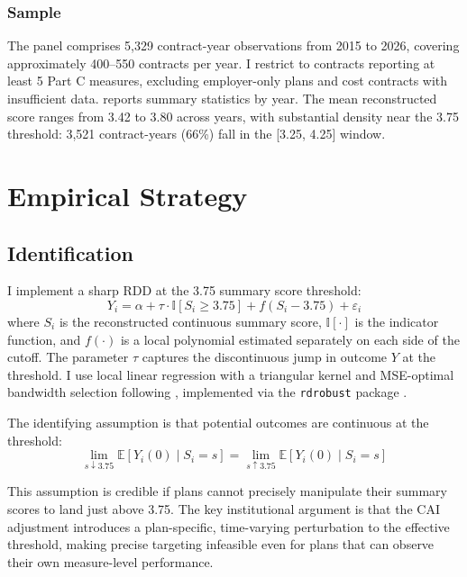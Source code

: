 \documentclass[12pt]{article}
\newcommand{\E}{\mathbb{E}}
\newcommand{\ind}{\mathbb{I}}
\begin{document}
\subsubsection*{Sample} The panel comprises 5,329 contract-year observations from 2015 to 2026, covering approximately 400--550 contracts per year. I restrict to contracts reporting at least 5 Part C measures, excluding employer-only plans and cost contracts with insufficient data.  reports summary statistics by year. The mean reconstructed score ranges from 3.42 to 3.80 across years, with substantial density near the 3.75 threshold: 3,521 contract-years (66\%) fall in the [3.25, 4.25] window.




\section{Empirical Strategy}
\label{sec:strategy}

\subsection{Identification}

I implement a sharp RDD at the 3.75 summary score threshold:
\begin{equation}
Y_i = \alpha + \tau \cdot \ind[S_i \geq 3.75] + f(S_i - 3.75) + \varepsilon_i
\end{equation}
where $S_i$ is the reconstructed continuous summary score, $\ind[\cdot]$ is the indicator function, and $f(\cdot)$ is a local polynomial estimated separately on each side of the cutoff. The parameter $\tau$ captures the discontinuous jump in outcome $Y$ at the threshold. I use local linear regression with a triangular kernel and MSE-optimal bandwidth selection following \citet{cattaneo2020}, implemented via the \texttt{rdrobust} package \citep{calonico2014}.

The identifying assumption is that potential outcomes are continuous at the threshold:
\begin{equation}
\lim_{s \downarrow 3.75} \E[Y_i(0) \mid S_i = s] = \lim_{s \uparrow 3.75} \E[Y_i(0) \mid S_i = s]
\end{equation}

This assumption is credible if plans cannot precisely manipulate their summary scores to land just above 3.75. The key institutional argument is that the CAI adjustment introduces a plan-specific, time-varying perturbation to the effective threshold, making precise targeting infeasible even for plans that can observe their own measure-level performance.
\end{document}
